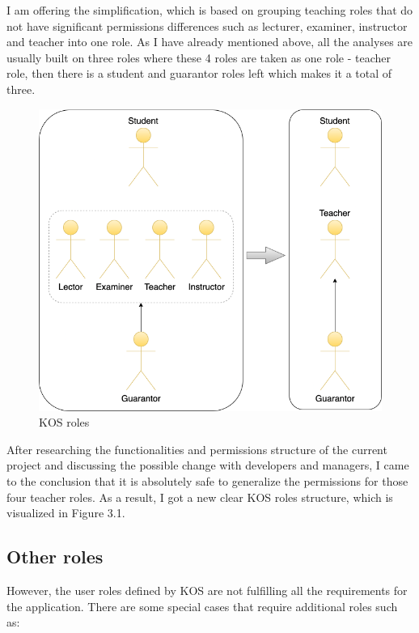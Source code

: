 \noindent I am offering the simplification, which is based on grouping teaching roles that do not have significant permissions differences such as lecturer, examiner, instructor and teacher into one role. As I have already mentioned above, all the analyses are usually built on three roles where these 4 roles are taken as one role - teacher role, then there is a student and guarantor roles left which makes it a total of three.\\

\begin{figure}[h]
\centering
\includegraphics[scale=0.52]{../png/kos_roles.png}
\caption{KOS roles}\label{picture:kos_roles}
\end{figure}


\noindent After researching the functionalities and permissions structure of the current project and discussing the possible change with developers and managers, I came to the conclusion that it is absolutely safe to generalize the permissions for those four teacher roles. As a result, I got a new clear KOS roles structure, which is visualized in Figure 3.1.




\subsection{Other roles}

\noindent However, the user roles defined by KOS are not fulfilling all the requirements for the application. There are some special cases that require additional roles such as:

